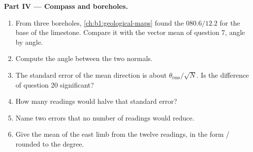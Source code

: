 \begin{problem}
\medskip
\noindent\textbf{Part IV --- Compass and boreholes.}
\begin{enumerate}[resume]
  \item From three boreholes, \cref{ch:b1:geological-maps} found the 
        $080.6/12.2$ for the base of the limestone. Compare it with the vector
        mean of question 7, angle by angle.
  \item Compute the angle between the two normals.
  \item The standard error of the mean direction is about
        $\theta_{\text{rms}}/\sqrt N$. Is the difference of question 20
        significant?
  \item How many readings would halve that standard error?
  \item Name two errors that no number of readings would reduce.
  \item Give the mean  of the east limb from the twelve readings, in
        the form / rounded to the degree.
\end{enumerate}
\end{problem}
